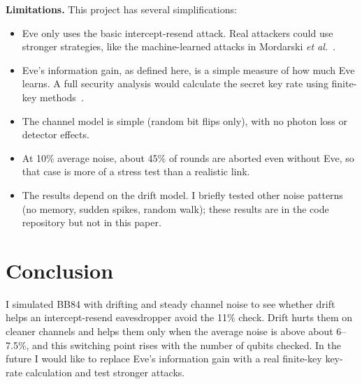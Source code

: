 \documentclass[11pt]{article}
\begin{document}
\textbf{Limitations.} This project has several simplifications:
\begin{itemize}
\item Eve only uses the basic intercept-resend attack. Real attackers could use stronger strategies, like the machine-learned attacks in Mordarski \emph{et al.}~\cite{Mordarski}.
\item Eve's information gain, as defined here, is a simple measure of how much Eve learns. A full security analysis would calculate the secret key rate using finite-key methods~\cite{Tomamichel}.
\item The channel model is simple (random bit flips only), with no photon loss or detector effects.
\item At 10\% average noise, about 45\% of rounds are aborted even without Eve, so that case is more of a stress test than a realistic link.
\item The results depend on the drift model. I briefly tested other noise patterns (no memory, sudden spikes, random walk); these results are in the code repository but not in this paper.
\end{itemize}

\section{Conclusion}

I simulated BB84 with drifting and steady channel noise to see whether drift helps an intercept-resend eavesdropper avoid the 11\% check. Drift hurts them on cleaner channels and helps them only when the average noise is above about 6--7.5\%, and this switching point rises with the number of qubits checked. In the future I would like to replace Eve's information gain with a real finite-key key-rate calculation and test stronger attacks.
\end{document}
